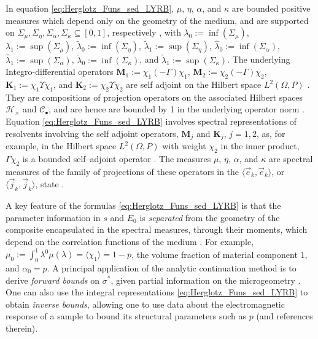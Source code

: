 \documentclass[english,12pt,jmp,graphicx]{revtex4-1}
\begin{document}
In equation
\eqref{eq:Herglotz_Funs_sed_LYRB}, $\mu$, $\eta$, $\alpha$, and $\kappa$
are bounded positive measures which depend only on the geometry of the
medium, and are supported on $\Sigma_\mu,\Sigma_\eta,\Sigma_\alpha,\Sigma_\kappa\subseteq[0,1]$, respectively
\cite{Golden:CMP-473,Bergman:AP-78}, with
%
%
$\lambda_0:=\inf(\Sigma_\mu)$, $\lambda_1:=\sup(\Sigma_\mu)$, $\tilde{\lambda}_0:=\inf(\Sigma_\eta)$,
$\tilde{\lambda}_1:=\sup(\Sigma_\eta)$, $\hat{\lambda}_0:=\inf(\Sigma_\alpha)$,
$\hat{\lambda}_1:=\sup(\Sigma_\alpha)$, $\check{\lambda}_0:=\inf(\Sigma_\kappa)$, and
$\check{\lambda}_1:=\sup(\Sigma_\kappa)$. The underlying Integro-differential operators
$\mathbf{M}_1:=\chi_1(-\Gamma)\chi_1$, $\mathbf{M}_2:=\chi_2(-\Gamma)\chi_2$,
$\mathbf{K}_1:=\chi_1\Upsilon\chi_1$, and $\mathbf{K}_2:=\chi_2\Upsilon\chi_2$ are self adjoint
on the Hilbert space $L^2(\Omega,P)$ \cite{Golden:CMP-473}. They are
compositions of projection operators on the associated Hilbert spaces
$\mathscr{H}_\times$ and $\mathscr{C}_\bullet$, and are hence are bounded by 1 in
the underlying operator norm
\cite{Folland:95,Golden:CMP-473}. Equation
\eqref{eq:Herglotz_Funs_sed_LYRB} involves spectral representations of
resolvents involving the self adjoint operators, $\mathbf{M}_j$ and
$\mathbf{K}_j$, $j=1,2$, as, for example, in the Hilbert space
$L^2(\Omega,P)$ with weight $\chi_2$ in the inner product, $\Gamma\chi_2$ is a
bounded self--adjoint operator \cite{Golden:CMP-473}. The measures
$\mu$, $\eta$, $\alpha$, and $\kappa$ are spectral measures of the family of
projections of these operators in the $\langle\vec{e}_k,\vec{e}_k\rangle$, or 
$\langle\vec{j}_k,\vec{j}_k\rangle$, state \cite{Golden:CMP-473,Reed-1980}.

A key feature of the formulas \eqref{eq:Herglotz_Funs_sed_LYRB} is
that the parameter information in $s$ and $E_0$ is {\it separated}
from the geometry of the composite encapsulated in the spectral
measures, through their moments, which depend on the correlation 
functions of the medium \cite{Golden:CMP-473}. For example, 
$\mu_0:=\int_0^1\lambda^0\mu(\lambda)=\langle\chi_1\rangle=1-p$, the volume fraction of material
component 1, and $\alpha_0=p$. A principal application of the analytic
continuation method is to derive \emph{forward bounds} on $\sigma^*$, given
partial information on the microgeometry
\cite{Bergman:PRL-1285,Milton:APL-300,Golden:CMP-473,Bergman:AP-78}. One  
can also use the integral representations
\eqref{eq:Herglotz_Funs_sed_LYRB} to obtain \emph{inverse bounds},
allowing one to use data about the electromagnetic response of a
sample to bound its structural parameters such as $p$
\cite{Golden:JoB:337} (and references therein).
         
\end{document}

